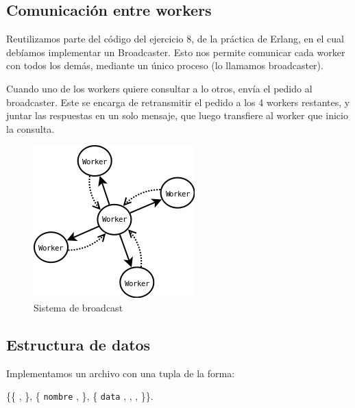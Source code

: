 \documentclass[a4paper, 8pt]{article}
\begin{document}
  \subsection{Comunicación entre workers}
  Reutilizamos parte del código del ejercicio 8, de la práctica de Erlang, en el cual debíamos implementar un Broadcaster.
  Esto nos permite comunicar cada worker con todos los demás, mediante un único proceso (lo llamamos broadcaster).
  
  Cuando uno de los workers quiere consultar a lo otros, envía el pedido al broadcaster. Este se encarga de retransmitir el pedido
  a los 4 workers restantes, y juntar las respuestas en un solo mensaje, que luego transfiere al worker
  que inicio la consulta.
  
 \begin{figure}[htbp]
   \centering
     \includegraphics[scale=0.75]{dia2}
     \caption{Sistema de broadcast}
   \label{Figura 2}
 \end{figure}
  
  
\subsection{Estructura de datos}

  Implementamos un archivo con una tupla de la forma:

\vspace{2.5mm}

\{\{  ,  \}, \{ \texttt{nombre} ,  \}, \{ \texttt{data} ,  ,  ,  \}\}.

\vspace{2.5mm}
\end{document}
